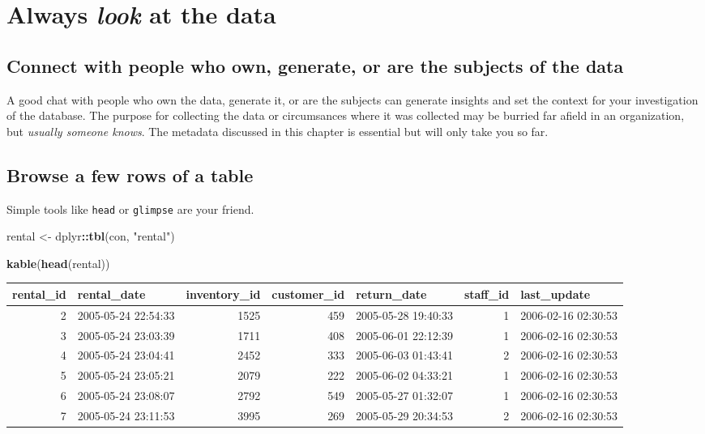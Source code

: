 \documentclass[]{book}
\newenvironment{Shaded}{\begin{snugshade}}{\end{snugshade}}
\newcommand{\KeywordTok}[1]{\textcolor[rgb]{0.13,0.29,0.53}{\textbf{#1}}}
\newcommand{\NormalTok}[1]{#1}
\newcommand{\OperatorTok}[1]{\textcolor[rgb]{0.81,0.36,0.00}{\textbf{#1}}}
\newcommand{\StringTok}[1]{\textcolor[rgb]{0.31,0.60,0.02}{#1}}
\theoremstyle{definition}
\theoremstyle{definition}
\theoremstyle{definition}
\theoremstyle{remark}
\begin{document}
\hypertarget{always-look-at-the-data}{%
\section{\texorpdfstring{Always \emph{look} at the
data}{Always look at the data}}\label{always-look-at-the-data}}

\hypertarget{connect-with-people-who-own-generate-or-are-the-subjects-of-the-data}{%
\subsection{Connect with people who own, generate, or are the subjects
of the
data}\label{connect-with-people-who-own-generate-or-are-the-subjects-of-the-data}}

A good chat with people who own the data, generate it, or are the
subjects can generate insights and set the context for your
investigation of the database. The purpose for collecting the data or
circumsances where it was collected may be burried far afield in an
organization, but \emph{usually someone knows}. The metadata discussed
in this chapter is essential but will only take you so far.

\hypertarget{browse-a-few-rows-of-a-table}{%
\subsection{Browse a few rows of a
table}\label{browse-a-few-rows-of-a-table}}

Simple tools like \texttt{head} or \texttt{glimpse} are your friend.

\begin{Shaded}
\begin{Highlighting}[]
\NormalTok{rental <-}\StringTok{ }\NormalTok{dplyr}\OperatorTok{::}\KeywordTok{tbl}\NormalTok{(con, }\StringTok{"rental"}\NormalTok{)}

\KeywordTok{kable}\NormalTok{(}\KeywordTok{head}\NormalTok{(rental))}
\end{Highlighting}
\end{Shaded}

\begin{tabular}{r|l|r|r|l|r|l}
\hline
rental\_id & rental\_date & inventory\_id & customer\_id & return\_date & staff\_id & last\_update\\
\hline
2 & 2005-05-24 22:54:33 & 1525 & 459 & 2005-05-28 19:40:33 & 1 & 2006-02-16 02:30:53\\
\hline
3 & 2005-05-24 23:03:39 & 1711 & 408 & 2005-06-01 22:12:39 & 1 & 2006-02-16 02:30:53\\
\hline
4 & 2005-05-24 23:04:41 & 2452 & 333 & 2005-06-03 01:43:41 & 2 & 2006-02-16 02:30:53\\
\hline
5 & 2005-05-24 23:05:21 & 2079 & 222 & 2005-06-02 04:33:21 & 1 & 2006-02-16 02:30:53\\
\hline
6 & 2005-05-24 23:08:07 & 2792 & 549 & 2005-05-27 01:32:07 & 1 & 2006-02-16 02:30:53\\
\hline
7 & 2005-05-24 23:11:53 & 3995 & 269 & 2005-05-29 20:34:53 & 2 & 2006-02-16 02:30:53\\
\hline
\end{tabular}
\end{document}
